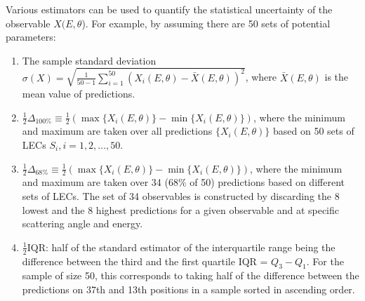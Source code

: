 \begin{enumerate}
Various estimators can be used to quantify the statistical uncertainty of the observable $X(E, \theta$). 
For example, by assuming there are 50 sets of potential parameters: 
\begin{enumerate}[label=(\alph*)]
\item The sample standard deviation $\sigma (X) = \sqrt{\frac{1}{50-1}\sum\limits_{i = 1}^{50}\left(X_{i}(E,\theta) - \bar{X}(E, \theta)\right)^{2}}$, where $\bar{X}(E, \theta)$ is the mean value of predictions.
\item $\frac{1}{2}\Delta_{100\%} \equiv \frac{1}{2}\left(\max\lbrace X_{i}(E, \theta)\rbrace - \min\lbrace X_{i}(E, \theta)\rbrace \right)$, where the minimum and maximum are taken over all predictions $\lbrace X_{i}(E, \theta)\rbrace$ based on 50 sets of LECs $S_{i}, i = 1, 2, \ldots, 50$.
\item $\frac{1}{2}\Delta_{68\%} \equiv \frac{1}{2}\left(\max\lbrace X_{i}(E, \theta)\rbrace - \min\lbrace X_{i}(E, \theta)\rbrace \right)$, where the minimum and maximum are taken over 34 (68\% of 50) predictions based on different sets of LECs. The set of 34 observables is constructed by discarding the 8 lowest and the 8 highest
predictions for a given observable and at specific scattering angle and energy.
\item $\frac{1}{2}$IQR: half of the standard estimator of the interquartile range being the difference between the third and the first quartile IQR = $Q_{3} - Q_{1}$. For the sample of size 50, this corresponds to taking half of the difference between the predictions on 37th and 13th positions in a sample sorted in ascending order. 
\end{enumerate}
\end{enumerate}

